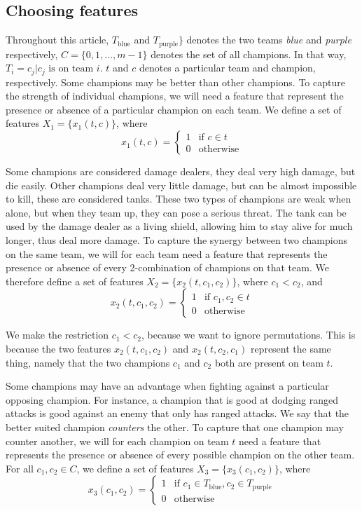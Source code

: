\subsection{Choosing features}\label{sec:choosingfeatures}
Throughout this article, $T_\text{blue}$ and $T_\text{purple}\}$ denotes the two teams \emph{blue} and \emph{purple} respectively, $C = \{0, 1, \dots, m-1\}$ denotes the set of all champions. In that way, $T_i = {c_j | c_j \text{ is on team } i}$. $t$ and $c$ denotes a particular team and champion, respectively.
Some champions may be better than other champions. To capture the strength of individual champions, we will need a feature that represent the presence or absence of a particular champion on each team.
We define a set of features $X_1 = \{x_1(t, c)\}$, where
\[
x_1(t, c) = 
\begin{cases} 
  1 & \text{if } c \in t \\
  0 & \text{otherwise} 
\end{cases}
\]

Some champions are considered damage dealers, they deal very high damage, but die easily. Other champions deal very little damage, but can be almost impossible to kill, these are considered tanks. These two types of champions are weak when alone, but when they team up, they can pose a serious threat. The tank can be used by the damage dealer as a living shield, allowing him to stay alive for much longer, thus deal more damage.
To capture the synergy between two champions on the same team, we will for each team need a feature that represents the presence or absence of every 2-combination %
of champions on that team. We therefore define a set of features $X_2 = \{x_2(t, c_1, c_2)\}$, where $c_1 < c_2$, and
\[
x_2(t, c_1, c_2) = 
\begin{cases} 
1 & \text{if } c_1, c_2 \in t\\
0 & \text{otherwise} 
\end{cases}
\]

We make the restriction $c_1 < c_2$, because we want to ignore permutations. This is because the two features $x_2(t, c_1, c_2)$ and $x_2(t, c_2, c_1)$ represent the same thing, namely that the two champions $c_1$ and $c_2$ both are present on team $t$.

Some champions may have an advantage when fighting against a particular opposing champion.
For instance, a champion that is good at dodging ranged attacks is good against an enemy that only has ranged attacks.
We say that the better suited champion \emph{counters} the other.
To capture that one champion may counter another, we will for each champion on team $t$ need a feature that represents the presence or absence of every possible champion on the other team.
For all $c_1, c_2 \in C$, we define a set of features $X_3= \{x_3(c_1, c_2) \}$, where
\[x_3(c_1, c_2) = 
\begin{cases} 
1 & \text{if } c_1 \in T_\text{blue}, c_2 \in T_\text{purple} \\ 
0 & \text{otherwise} 
\end{cases}\]

